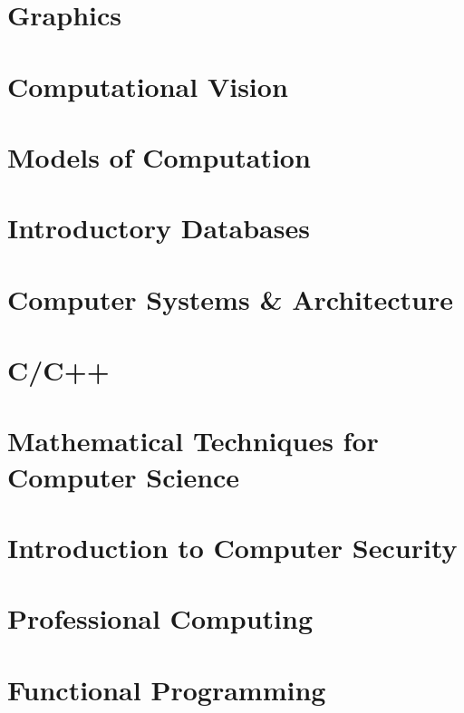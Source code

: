 \documentclass[12pt, a4paper, oneside, titlepage]{report}
\begin{document}
\newpage
\tableofcontents
\newpage
{}

\chapter{Graphics}

\chapter{Computational Vision}

\chapter{Models of Computation}

\chapter{Introductory Databases}

\chapter{Computer Systems \& Architecture}

\chapter{C/C++}

\chapter{Mathematical Techniques for Computer Science}

\chapter{Introduction to Computer Security}

\chapter{Professional Computing}

\chapter{Functional Programming}

\end{document}

